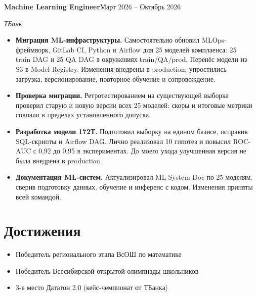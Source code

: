 \documentclass[a4paper,11pt]{article}
\newcommand{\entry}[3]{\textbf{#1}\hfill #3\par\textit{#2}\par}
\begin{document}
\vspace{4pt}
\entry{Machine Learning Engineer}{ТБанк}{Март 2026 -- Октябрь 2026}
\begin{itemize}
\item \textbf{Миграция ML-инфраструктуры.} Самостоятельно обновил MLOps-фреймворк, GitLab CI, Python и Airflow для 25 моделей комплаенса: 25 train DAG и 25 QA DAG в окружениях train/QA/prod. Перенёс модели из S3 в Model Registry. Изменения внедрены в production; упростились загрузка, версионирование, повторное обучение и сопровождение.
\item \textbf{Проверка миграции.} Ретротестированием на существующей выборке проверил старую и новую версии всех 25 моделей: скоры и итоговые метрики совпали в пределах установленного допуска.
\item \textbf{Разработка модели 172Т.} Подготовил выборку на едином базисе, исправив SQL-скрипты и Airflow DAG. Лично реализовал 10 гипотез и повысил ROC-AUC с 0,92 до 0,95 в экспериментах. До моего ухода улучшенная версия не была внедрена в production.
\item \textbf{Документация ML-систем.} Актуализировал ML System Doc по 25 моделям, сверив подготовку данных, обучение и инференс с кодом. Изменения приняты всей командой.
\end{itemize}
\endgroup
\section*{Достижения}
\begin{itemize}
\item Победитель регионального этапа ВсОШ по математике
\item Победитель Всесибирской открытой олимпиады школьников
\item 3-е место Дататон 2.0 (кейс-чемпионат от ТБанка)
\end{itemize}
\newpage
\end{document}
